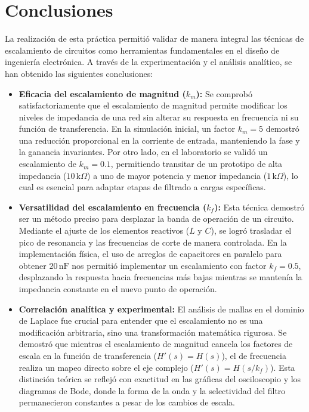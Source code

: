 \section{Conclusiones}

La realización de esta práctica permitió validar de manera integral las técnicas de escalamiento de circuitos como herramientas fundamentales en el diseño de ingeniería electrónica. A través de la experimentación y el análisis analítico, se han obtenido las siguientes conclusiones:

\begin{itemize}
	\item \textbf{Eficacia del escalamiento de magnitud ($k_m$):} Se comprobó satisfactoriamente que el escalamiento de magnitud permite modificar los niveles de impedancia de una red sin alterar su respuesta en frecuencia ni su función de transferencia. En la simulación inicial, un factor $k_m = 5$ demostró una reducción proporcional en la corriente de entrada, manteniendo la fase y la ganancia invariantes. Por otro lado, en el laboratorio se validó un escalamiento de $k_m = 0.1$, permitiendo transitar de un prototipo de alta impedancia ($10\,\text{k}\Omega$) a uno de mayor potencia y menor impedancia ($1\,\text{k}\Omega$), lo cual es esencial para adaptar etapas de filtrado a cargas específicas.
	
	\item \textbf{Versatilidad del escalamiento en frecuencia ($k_f$):} Esta técnica demostró ser un método preciso para desplazar la banda de operación de un circuito. Mediante el ajuste de los elementos reactivos ($L$ y $C$), se logró trasladar el pico de resonancia y las frecuencias de corte de manera controlada. En la implementación física, el uso de arreglos de capacitores en paralelo para obtener $20\,\text{nF}$ nos permitió implementar un escalamiento con factor $k_f = 0.5$, desplazando la respuesta hacia frecuencias más bajas mientras se mantenía la impedancia constante en el nuevo punto de operación.
	
	\item \textbf{Correlación analítica y experimental:} El análisis de mallas en el dominio de Laplace fue crucial para entender que el escalamiento no es una modificación arbitraria, sino una transformación matemática rigurosa. Se demostró que mientras el escalamiento de magnitud cancela los factores de escala en la función de transferencia ($H'(s) = H(s)$), el de frecuencia realiza un mapeo directo sobre el eje complejo ($H'(s) = H(s/k_f)$). Esta distinción teórica se reflejó con exactitud en las gráficas del osciloscopio y los diagramas de Bode, donde la forma de la onda y la selectividad del filtro permanecieron constantes a pesar de los cambios de escala.
	

\end{itemize}
